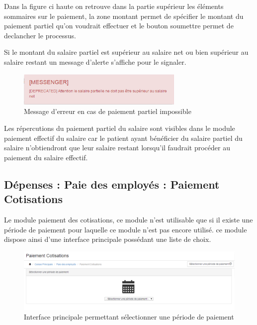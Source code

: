 \documentclass[12pt,a4paper]{report}
\begin{document}
Dans la figure ci haute on retrouve dans la partie supérieur les éléments sommaires sur le paiement, la zone montant permet de spécifier le montant du paiement partiel qu'on voudrait effectuer et le bouton soumettre permet de declancher le processus.

Si le montant du salaire partiel est supérieur au salaire net ou bien supérieur au salaire restant un message d'alerte s'affiche pour le signaler.

\begin{figure}[h]
\begin{center}
\includegraphics[width=8cm]{pic/errorPartialPaiement.png}
\end{center}
\caption{Message d'erreur en cas de paiement partiel impossible}
\label{Message d'erreur en cas de paiement partiel impossible}
\end{figure}


Les répercutions du paiement partiel du salaire sont visibles dans le module paiement effectif du salaire car le patient ayant bénéficier du salaire partiel du salaire n'obtiendront que leur salaire restant lorsqu'il faudrait procéder au paiement du salaire effectif.

\newpage
\subsection{Dépenses : Paie des employés : Paiement Cotisations}
Le module paiement des cotisations, ce module n'est utilisable que si il existe une période de paiement pour laquelle ce module n'est pas encore utilisé. ce module dispose ainsi d'une interface principale possédant une liste de choix.

\begin{figure}[h]
\begin{center}
\includegraphics[width=14cm]{pic/paiemCotisations.png}
\end{center}
\caption{Interface principale permettant sélectionner une période de paiement}
\label{Interface principale permettant sélectionner une période de paiement}
\end{figure}
\end{document}
